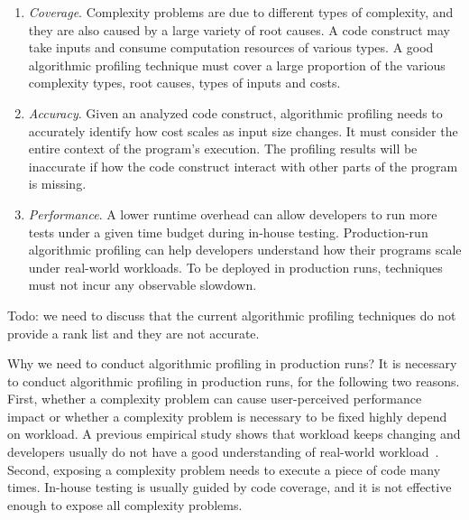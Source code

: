 \begin{enumerate}

\item \textit{Coverage}. Complexity problems are due to different types of complexity,
and they are also caused by a large variety of root causes.
A code construct may take inputs and
consume computation resources of various types.
A good algorithmic profiling technique must cover a
large proportion of the various complexity types, root causes, types of inputs and costs.


\item \textit{Accuracy}.
Given an analyzed code construct,
algorithmic profiling needs to accurately identify
how cost scales as input size changes.
It must consider the entire context of the program's execution.
The profiling results will be inaccurate if how the code construct interact with other parts of the program is missing.

\item \textit{Performance}.
A lower runtime overhead can allow developers to run more tests
under a given time budget during in-house testing.
Production-run algorithmic profiling can help developers
understand how their programs scale
under real-world workloads.
To be deployed in production runs,
techniques must not incur any observable slowdown.


\end{enumerate}

\fi

{\color{red} Todo: we need to discuss that the current algorithmic profiling techniques do not provide a rank list
and they are not accurate. }

{\color{red} Why we need to conduct algorithmic profiling in production runs?}
It is necessary to conduct algorithmic profiling in production runs, 
for the following two reasons. 
First, whether a complexity problem can 
cause user-perceived performance 
impact or whether a complexity problem is necessary to be fixed 
highly depend on workload. 
A previous empirical study shows that workload keeps changing and 
developers usually do not have a good understanding of 
real-world workload~\citep{PerfBug}. 
Second, exposing a complexity problem needs to 
execute a piece of code many times. 
In-house testing is usually guided by code coverage, 
and it is not effective enough to expose all complexity problems. 


